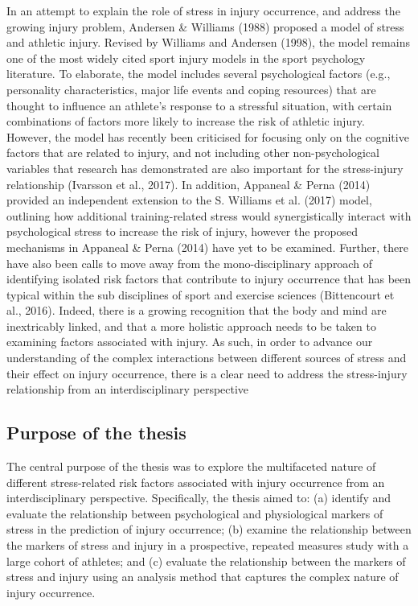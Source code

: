 \documentclass[
  english,
  man,floatsintext]{apa6}
\begin{document}
In an attempt to explain the role of stress in injury occurrence, and address the growing injury problem, Andersen \& Williams (1988) proposed a model of stress and athletic injury.
Revised by Williams and Andersen (1998), the model remains one of the most widely cited sport injury models in the sport psychology literature.
To elaborate, the model includes several psychological factors (e.g., personality characteristics, major life events and coping resources) that are thought to influence an athlete's response to a stressful situation, with certain combinations of factors more likely to increase the risk of athletic injury.
However, the model has recently been criticised for focusing only on the cognitive factors that are related to injury, and not including other non-psychological variables that research has demonstrated are also important for the stress-injury relationship (Ivarsson et al., 2017).
In addition, Appaneal \& Perna (2014) provided an independent extension to the S. Williams et al. (2017) model, outlining how additional training-related stress would synergistically interact with psychological stress to increase the risk of injury,
however the proposed mechanisms in Appaneal \& Perna (2014) have yet to be examined.
Further, there have also been calls to move away from the mono-disciplinary approach of identifying isolated risk factors that contribute to injury occurrence that has been typical within the sub disciplines of sport and exercise sciences (Bittencourt et al., 2016).
Indeed, there is a growing recognition that the body and mind are inextricably linked, and that a more holistic approach needs to be taken to examining factors associated with injury.
As such, in order to advance our understanding of the complex interactions between different sources of stress and their effect on injury occurrence, there is a clear need to address the stress-injury relationship from an interdisciplinary perspective

\hypertarget{purpose-of-the-thesis}{%
\subsection{Purpose of the thesis}\label{purpose-of-the-thesis}}

The central purpose of the thesis was to explore the multifaceted nature of different stress-related risk factors associated with injury occurrence from an interdisciplinary perspective. Specifically, the thesis aimed to:
(a) identify and evaluate the relationship between psychological and physiological markers of stress in the prediction of injury occurrence;
(b) examine the relationship between the markers of stress and injury in a prospective, repeated measures study with a large cohort of athletes; and
(c) evaluate the relationship between the markers of stress and injury using an analysis method that captures the complex nature of injury occurrence.
\end{document}
